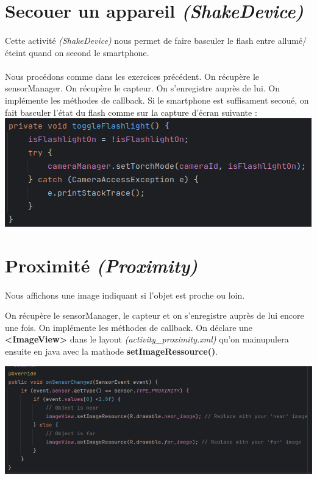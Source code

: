 \documentclass[a4paper]{article}
\begin{document}
\begin{multicols}{2}
        \section{Secouer un appareil \emph{(ShakeDevice)}}
            \paragraph{}
                Cette activité \emph{(ShakeDevice)} nous permet de faire basculer le flash entre allumé/éteint quand on second le smartphone.
            \paragraph{}
                Nous procédons comme dans les exercices précédent. On récupère le sensorManager. On récupère le capteur. On s'enregistre auprès de lui. On implémente les méthodes de callback. Si le smartphone est suffisament secoué, on fait basculer l'état du flash comme sur la capture d'écran suivante :
                \includegraphics[width=.49\textwidth]{shake/toggle}
        \section{Proximité \emph{(Proximity)}}
            \paragraph{}
                Nous affichons une image indiquant si l'objet est proche ou loin.

                On récupère le sensorManager, le capteur et on s'enregistre auprès de lui encore une fois. On implémente les méthodes de callback. On déclare une \textbf{<ImageView>} dans le layout \emph{(activity\_proximity.xml)} qu'on mainupulera ensuite en java avec la mathode \textbf{setImageRessource()}.
                
                \noindent\includegraphics[width=.49\textwidth]{proximity/onSensorChanged}

\end{multicols}
\end{document}
